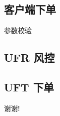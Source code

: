 \documentclass[12pt]{ctexbeamer}	%
\begin{document}

\subsection{客户端下单}

\begin{frame}{参数校验}
\end{frame}


\subsection{UFR 风控}

\begin{frame}{}
\end{frame}


\subsection{UFT 下单}

\begin{frame}{}
\end{frame}


\begin{frame}
\centerline{\Large 谢谢!}
\end{frame}
\end{document}

